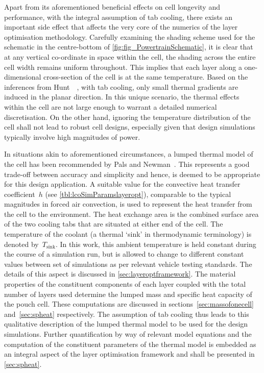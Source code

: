 Apart  from  its  aforementioned  beneficial   effects  on  cell  longevity  and
performance,  with the  integral  assumption  of tab  cooling,  there exists  an
important side effect  that affects the very  core of the numerics  of the layer
optimisation methodology.  Carefully examining the  shading scheme used  for the
schematic  in the  centre-bottom  of  \cref{fig:fig_PowertrainSchematic}, it  is
clear that  at any vertical  co-ordinate in space  within the cell,  the shading
across the entire cell width remains  uniform throughout. This implies that each
layer  along  a  one-dimensional  cross-section  of the  cell  is  at  the  same
temperature. Based  on the inferences from  Hunt~\etal~\cite{Hunt2016}, with tab
cooling, only  small thermal gradients are  induced in the planar  direction. In
this unique scenario,  the thermal effects within the cell  are not large enough
to warrant a detailed numerical discretisation.  On the other hand, ignoring the
temperature distribution  of the  cell shall  not lead  to robust  cell designs,
especially given  that design simulations  typically involve high  magnitudes of
power.

In  situations akin  to  aforementioned circumstances,  a  lumped thermal  model
of  the cell  has  been  recommended by  Pals  and Newman~\cite{Pals1995}.  This
represents a good trade-off between accuracy and simplicity and hence, is deemed
to  be  appropriate for  this  design  application.  A  suitable value  for  the
convective heat transfer  coefficient~$h$ (see \cref{tbl:lcoSimParamslayeropt}),
comparable  to the  typical  magnitudes in  forced air  convection,  is used  to
represent the heat transfer from the  cell to the environment. The heat exchange
area is the combined  surface area of the two cooling tabs  that are situated at
either end  of the  cell. The temperature  of the coolant  (a thermal  `sink' in
thermodynamic  terminology) is  denoted by~$T_\text{sink}$.  In this  work, this
ambient temperature is held constant during  the course of a simulation run, but
is allowed  to change to  different constant  values between set  of simulations
as  per relevant  vehicle  testing  standards. The  details  of  this aspect  is
discussed  in  \cref{sec:layeroptframework}.  The  material  properties  of  the
constituent components  of each layer  coupled with  the total number  of layers
used  determine  the  lumped  mass  and specific  heat  capacity  of  the  pouch
cell.  These  computations  are  discussed  in  sections~\ref{sec:massofonecell}
and~\ref{sec:spheat} respectively. The  assumption of tab cooling  thus leads to
this qualitative  description of  the lumped  thermal model to  be used  for the
design simulations.  Further quantification by  way of relevant  model equations
and  the computation  of  the constituent  parameters of  the  thermal model  is
embedded as an integral aspect of  the layer optimisation framework and shall be
presented in \cref{sec:spheat}.

